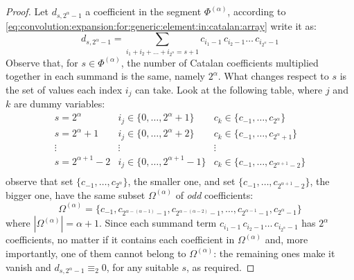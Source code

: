 \begin{proof}
Let $d_{s,2^{\alpha}-1}$ a coefficient in the segment $\Phi^{(\alpha)}$, 
according to \autoref{eq:convolution:expansion:for:generic:element:in:catalan:array} 
write it as:
\begin{displaymath}
    d_{s, 2^{\alpha}-1} = \sum_{i_{1}+i_{2}+\ldots+i_{2^{\alpha}}=s+1}
        {c_{i_{1}-1}\,c_{i_{2}-1}\ldots\,c_{i_{2^{\alpha}}-1}}
\end{displaymath}
Observe that, for $s\in\Phi^{(\alpha)}$, the number of Catalan
coefficients multiplied together in each summand is the same, namely
$2^{\alpha}$.  What changes respect to $s$ is the set of values each
index $i_{j}$ can take. Look at the following table, where $j$ and $k$
are dummy variables:
\begin{displaymath}
    \begin{array}{c|c|c}
        s = 2^{\alpha} 
            & i_{j}\in\lbrace0,\ldots,2^{\alpha}+1\rbrace 
            & c_{k}\in\lbrace c_{-1},\ldots,c_{2^{\alpha}}\rbrace\\
        s = 2^{\alpha} +1
            & i_{j}\in\lbrace0,\ldots,2^{\alpha}+2\rbrace 
            & c_{k}\in\lbrace c_{-1},\ldots,c_{2^{\alpha}+1}\rbrace\\
        \vdots & \vdots&\vdots \\
        s = 2^{\alpha+1} -2
            & i_{j}\in\lbrace0,\ldots,2^{\alpha+1}-1\rbrace 
            & c_{k}\in\lbrace c_{-1},\ldots,c_{2^{\alpha+1}-2}\rbrace\\
    \end{array}
\end{displaymath}
observe that set $\lbrace c_{-1},\ldots,c_{2^{\alpha}}\rbrace$, the smaller one, and set
$\lbrace c_{-1},\ldots,c_{2^{\alpha+1}-2}\rbrace$, the bigger one, have the same subset
$\Omega^{(\alpha)}$ of \emph{odd} coefficients: 
\begin{displaymath}
    \Omega^{(\alpha)}=\lbrace c_{-1}, c_{2^{\alpha-(\alpha-1)}-1},c_{2^{\alpha-(\alpha-2)}-1},\ldots, 
        c_{2^{\alpha-1}-1},c_{2^{\alpha}-1}\rbrace
\end{displaymath}
where $\left|\Omega^{(\alpha)}\right|=\alpha+1$.
Since each summand term $c_{i_{1}-1}\,c_{i_{2}-1}\ldots\,c_{i_{2^{\alpha}}-1}$ 
has $2^{\alpha}$ coefficients, no matter if it contains each coefficient in $\Omega^{(\alpha)}$ and,
more importantly, one of them cannot belong to $\Omega^{(\alpha)}$:
the remaining ones make it vanish and $d_{s, 2^{\alpha}-1} \equiv_{2} 0$, for any suitable $s$,
as required.

\end{proof}

